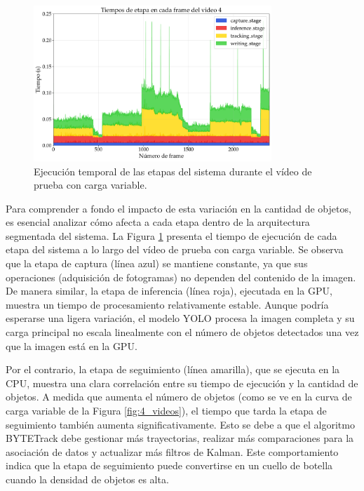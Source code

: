 \documentclass[11pt,spanish,listoffigures,listoftables]{tfgetsinf}
\begin{document}
\begin{figure}[H]
   \centering
   \includegraphics[width=0.8\textwidth]{excels/inferencia/cantidad_objetos/resultados/tiempo_etapa_cada_frame_video4/tiempo_etapa_video4.pdf}
   \caption[Ejecución temporal de las etapas del sistema durante el vídeo de prueba con carga variable]{Ejecución temporal de las etapas del sistema durante el vídeo de prueba con carga variable.}
   \label{fig:tiempos_etapa}
\end{figure}

Para comprender a fondo el impacto de esta variación en la cantidad de objetos, es esencial analizar cómo afecta a cada etapa dentro de la arquitectura segmentada del sistema. La Figura \ref{fig:tiempos_etapa} presenta el tiempo de ejecución de cada etapa del sistema a lo largo del vídeo de prueba con carga variable.
Se observa que la etapa de captura (línea azul) se mantiene constante, ya que sus operaciones (adquisición de fotogramas) no dependen del contenido de la imagen. De manera similar, la etapa de inferencia (línea roja), ejecutada en la GPU, muestra un tiempo de procesamiento relativamente estable. Aunque podría esperarse una ligera variación, el modelo YOLO procesa la imagen completa y su carga principal no escala linealmente con el número de objetos detectados una vez que la imagen está en la GPU.

Por el contrario, la etapa de seguimiento (línea amarilla), que se ejecuta en la CPU, muestra una clara correlación entre su tiempo de ejecución y la cantidad de objetos. A medida que aumenta el número de objetos (como se ve en la curva de carga variable de la Figura \ref{fig:4_videos}), el tiempo que tarda la etapa de seguimiento también aumenta significativamente. Esto se debe a que el algoritmo BYTETrack debe gestionar más trayectorias, realizar más comparaciones para la asociación de datos y actualizar más filtros de Kalman. Este comportamiento indica que la etapa de seguimiento puede convertirse en un cuello de botella cuando la densidad de objetos es alta.
\end{document}
